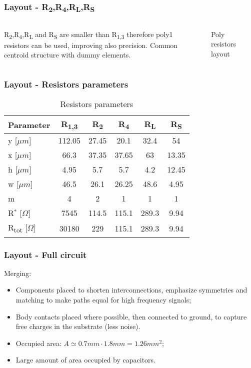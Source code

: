 \begin{frame}
\frametitle{Layout - R\textsubscript{2},R\textsubscript{4},R\textsubscript{L},R\textsubscript{S}}
\begin{columns}
	R\textsubscript{2},R\textsubscript{4},R\textsubscript{L} and R\textsubscript{S} are smaller than R\textsubscript{1,3} therefore poly1 resistors can be used, improving also precision. Common centroid structure with dummy elements.
	\begin{figure}[H]
		\centering
		
		\vfill
		\hfil
		\caption{Poly resistors layout}
	\end{figure}
\end{columns}
\end{frame}

\begin{frame}
	\frametitle{Layout - Resistors parameters}
	\begin{table} [h]
		\label{tab:specs}
		\caption{Resistors parameters}
		\centering	
		\begin{tabular}{lccccc} 
			\toprule 
			Parameter & R\textsubscript{1,3}& R\textsubscript{2} & R\textsubscript{4}&R\textsubscript{L}&R\textsubscript{S} \\ 
			\midrule
			y [$\mu m$] &112.05&27.45&20.1&32.4&54\\
			x [$\mu m$] &66.3&37.35&37.65&63&13.35\\
			h [$\mu m$] &4.95&5.7&5.7&4.2&12.45\\
			w [$\mu m$] &46.5&26.1&26.25&48.6&4.95\\
			m			&4&2&1&1&1\\
			R$^*$ [$\Omega$] & 7545&114.5&115.1&289.3&9.94\\
			R\textsubscript{tot} [$\Omega$]&30180&229&115.1&289.3&9.94\\
			\bottomrule 
		\end{tabular}	
	\end{table}

\end{frame}

\begin{frame}
	\frametitle{Layout - Full circuit}
	Merging:
	\begin{itemize}
		\item Components placed to shorten interconnections, emphasize symmetries and matching to make paths equal for high frequency signals;
		\item Body contacts placed where possible, then connected to ground, to capture free charges in the substrate (less noise).
		\item Occupied area: $A\simeq0.7mm \cdot 1.8mm = 1.26 mm^2$;
		\item Large amount of area occupied by capacitors.
	\end{itemize}
\end{frame}


